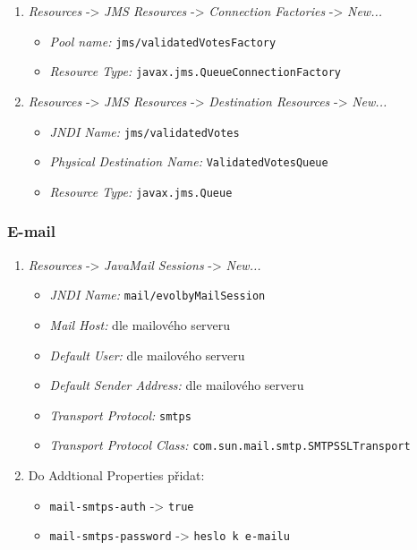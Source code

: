 \documentclass[11pt,twoside,a4paper]{book}
\begin{document}
\begin{enumerate}
	\item \textit{Resources} -> \textit{JMS Resources} -> \textit{Connection Factories} -> \textit{New...}
		\begin{itemize} 
			\item \textit{Pool name:} \texttt{jms/validatedVotesFactory}
			\item  \textit{Resource Type:} \texttt{javax.jms.QueueConnectionFactory}
		\end{itemize}
	\item \textit{Resources} -> \textit{JMS Resources} -> \textit{Destination Resources} -> \textit{New...}
		\begin{itemize}
			\item \textit{JNDI Name:} \texttt{jms/validatedVotes}
			\item \textit{Physical Destination Name:} \texttt{ValidatedVotesQueue}
			\item \textit{Resource Type:} \texttt{javax.jms.Queue}
		\end{itemize}
\end{enumerate}

\subsubsection{E-mail}

\begin{enumerate}
	\item  \textit{Resources} -> \textit{JavaMail Sessions} -> \textit{New...}
		\begin{itemize}
			\item \textit{JNDI Name:} \texttt{mail/evolbyMailSession}
        	\item \textit{Mail Host:} dle mailového serveru
        	\item \textit{Default User:} dle mailového serveru
        	\item \textit{Default Sender Address:} dle mailového serveru
        	\item \textit{Transport Protocol:} \texttt{smtps}
        	\item \textit{Transport Protocol Class:} \texttt{com.sun.mail.smtp.SMTPSSLTransport}
   		\end{itemize}
   \item Do Addtional Properties přidat:
		\begin{itemize}		        
			\item \texttt{mail-smtps-auth} -> \texttt{true}
        	\item \texttt{mail-smtps-password} -> \texttt{heslo k e-mailu}
        \end{itemize}
\end{enumerate}
\end{document}
